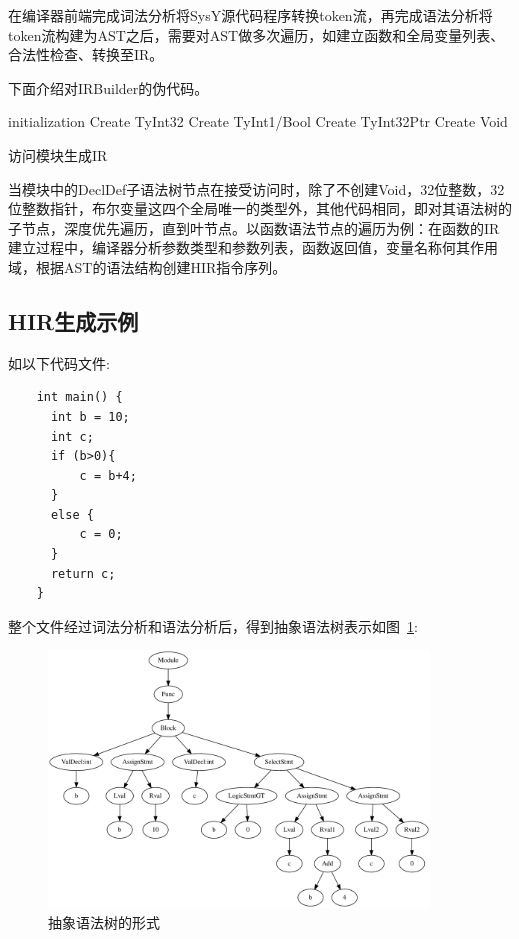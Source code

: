 在编译器前端完成词法分析将SysY源代码程序转换token流，再完成语法分析将token流构建为AST之后，需要对AST做多次遍历，如建立函数和全局变量列表、合法性检查、转换至IR。

下面介绍对IRBuilder的伪代码。

\begin{algorithm}[htb]
  \small
  \SetAlgoLined
  initialization\;
  Create TyInt32\;
  Create TyInt1/Bool\;
  Create TyInt32Ptr\;
  Create Void\;
  \caption{访问模块生成IR}
  \label{algo:algorithm1}
\end{algorithm}

当模块中的DeclDef子语法树节点在接受访问时，除了不创建Void，32位整数，32位整数指针，布尔变量这四个全局唯一的类型外，其他代码相同，即对其语法树的子节点，深度优先遍历，直到叶节点。以函数语法节点的遍历为例：在函数的IR建立过程中，编译器分析参数类型和参数列表，函数返回值，变量名称何其作用域，根据AST的语法结构创建HIR指令序列。

\subsection{HIR生成示例}

如以下代码文件:

\begin{verbatim}
    int main() {
      int b = 10;
      int c;
      if (b>0){
    	  c = b+4;  
      }
      else {
    	  c = 0;
      }
      return c;
    }
\end{verbatim}

整个文件经过词法分析和语法分析后，得到抽象语法树表示如图~\ref{fig:AST}:

\begin{figure}[htb]
  \centering
  \includegraphics[width=0.9\textwidth]{figures/ast.pdf}
  \caption{抽象语法树的形式}
  \label{fig:AST}
\end{figure}


